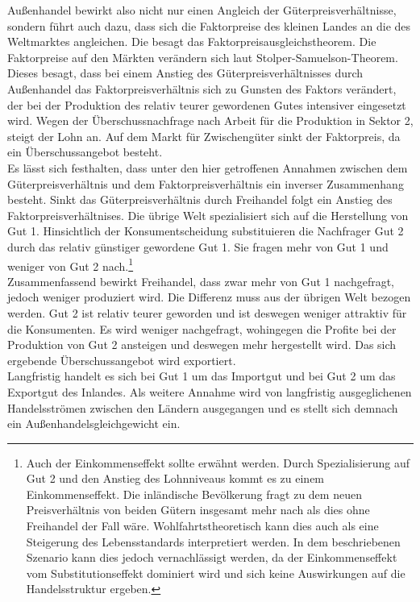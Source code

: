 Au{\ss}enhandel bewirkt also nicht nur einen Angleich der Güterpreisverhältnisse, sondern führt auch dazu, dass sich die Faktorpreise des kleinen Landes an die des Weltmarktes angleichen. Die besagt das Faktorpreisausgleichstheorem. Die Faktorpreise auf den Märkten verändern sich laut Stolper-Samuelson-Theorem. Dieses besagt, dass bei einem Anstieg des Güterpreisverhältnisses durch Au{\ss}enhandel das Faktorpreisverhältnis sich zu Gunsten des Faktors verändert, der bei der Produktion des relativ teurer gewordenen Gutes intensiver eingesetzt wird. Wegen der Überschussnachfrage nach Arbeit für die Produktion in Sektor 2, steigt der Lohn an. Auf dem Markt für Zwischengüter sinkt der Faktorpreis, da ein Überschussangebot besteht.\\


Es lässt sich festhalten, dass unter den hier getroffenen Annahmen zwischen dem Güterpreisverhältnis und dem Faktorpreisverhältnis ein inverser Zusammenhang besteht. Sinkt das Güterpreisverhältnis durch Freihandel folgt ein Anstieg des Faktorpreisverhältnises. Die übrige Welt spezialisiert sich auf die Herstellung von Gut 1. Hinsichtlich der Konsumentscheidung substituieren die Nachfrager Gut 2 durch das relativ günstiger gewordene Gut 1. Sie fragen mehr von Gut 1 und weniger von Gut 2 nach.\footnote{Auch der Einkommenseffekt sollte erwähnt werden. Durch Spezialisierung auf Gut 2 und den Anstieg des Lohnniveaus kommt es zu einem Einkommenseffekt. Die inländische Bevölkerung fragt zu dem neuen Preisverhältnis von beiden Gütern insgesamt mehr nach als dies ohne Freihandel der Fall wäre. Wohlfahrtstheoretisch kann dies auch als eine Steigerung des Lebensstandards interpretiert werden. In dem beschriebenen Szenario kann dies jedoch vernachlässigt werden, da der Einkommenseffekt vom Substitutionseffekt dominiert wird und sich keine Auswirkungen auf die Handelsstruktur ergeben.} \\


Zusammenfassend bewirkt Freihandel, dass zwar mehr von Gut 1 nachgefragt, jedoch weniger produziert wird. Die Differenz muss aus der übrigen Welt bezogen werden. Gut 2 ist relativ teurer geworden und ist deswegen weniger attraktiv für die Konsumenten. Es wird weniger nachgefragt, wohingegen die Profite bei der Produktion von Gut 2 ansteigen und deswegen mehr hergestellt wird. Das sich ergebende Überschussangebot wird exportiert.\\
Langfristig handelt es sich bei Gut 1 um das Importgut und bei Gut 2 um das Exportgut des Inlandes. Als weitere Annahme wird von langfristig ausgeglichenen Handelsströmen zwischen den Ländern ausgegangen und es stellt sich demnach ein Au{\ss}enhandelsgleichgewicht ein. 



